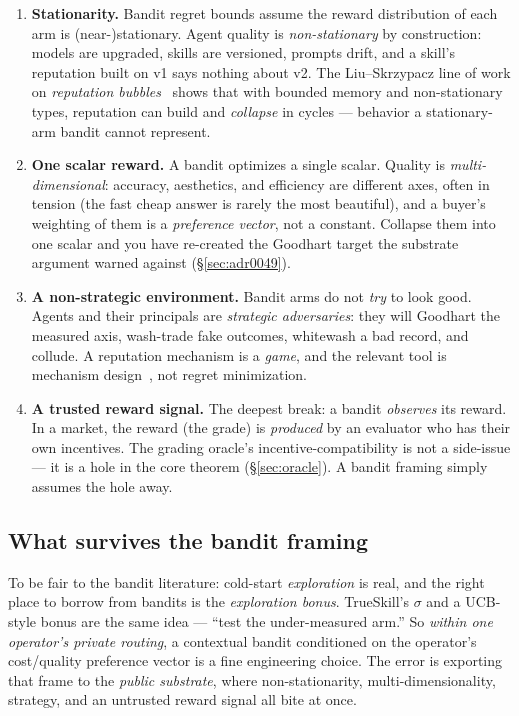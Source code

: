 \documentclass[11pt,a4paper]{article}
\theoremstyle{definition}
\begin{document}
\begin{enumerate}[leftmargin=1.6em]
  \item \textbf{Stationarity.} Bandit regret bounds assume the reward
  distribution of each arm is (near-)stationary. Agent quality is
  \emph{non-stationary} by construction: models are upgraded, skills are versioned,
  prompts drift, and a skill's reputation built on v1 says nothing about v2. The
  Liu--Skrzypacz line of work on \emph{reputation
  bubbles}~ shows that with bounded memory and
  non-stationary types, reputation can build and \emph{collapse} in cycles ---
  behavior a stationary-arm bandit cannot represent.
  \item \textbf{One scalar reward.} A bandit optimizes a single scalar. Quality is
  \emph{multi-dimensional}: accuracy, aesthetics, and efficiency are different
  axes, often in tension (the fast cheap answer is rarely the most beautiful), and
  a buyer's weighting of them is a \emph{preference vector}, not a constant. Collapse
  them into one scalar and you have re-created the Goodhart target the substrate
  argument warned against (\S\ref{sec:adr0049}).
  \item \textbf{A non-strategic environment.} Bandit arms do not \emph{try} to
  look good. Agents and their principals are \emph{strategic adversaries}: they
  will Goodhart the measured axis, wash-trade fake outcomes, whitewash a bad
  record, and collude. A reputation mechanism is a \emph{game}, and the relevant
  tool is mechanism design~, not regret minimization.
  \item \textbf{A trusted reward signal.} The deepest break: a bandit
  \emph{observes} its reward. In a market, the reward (the grade) is
  \emph{produced} by an evaluator who has their own incentives. The grading
  oracle's incentive-compatibility is not a side-issue --- it is a hole in the core
  theorem (\S\ref{sec:oracle}). A bandit framing simply assumes the hole away.
\end{enumerate}

\subsection{What survives the bandit framing}

To be fair to the bandit literature: cold-start \emph{exploration} is real, and the
right place to borrow from bandits is the \emph{exploration bonus}. TrueSkill's
$\sigma$ and a UCB-style bonus are the same idea --- ``test the under-measured
arm.'' So \emph{within one operator's private routing}, a contextual bandit
conditioned on the operator's cost/quality preference vector is a fine engineering
choice. The error is exporting that frame to the \emph{public substrate}, where
non-stationarity, multi-dimensionality, strategy, and an untrusted reward signal
all bite at once.
\end{document}
